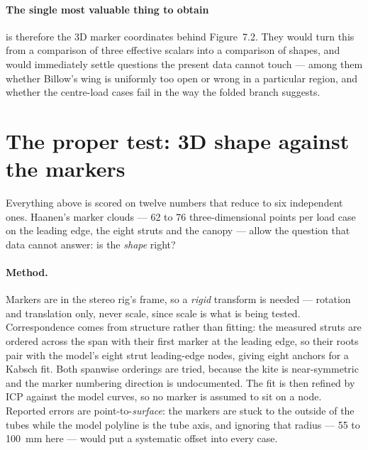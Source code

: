 \documentclass[11pt,a4paper]{article}
\begin{document}
\paragraph{The single most valuable thing to obtain} is therefore the 3D marker
coordinates behind Figure~7.2. They would turn this from a comparison of three
effective scalars into a comparison of shapes, and would immediately settle
questions the present data cannot touch --- among them whether Billow's wing is
uniformly too open or wrong in a particular region, and whether the centre-load
cases fail in the way the folded branch suggests.

\section{The proper test: 3D shape against the markers}
\label{sec:shape}

Everything above is scored on twelve numbers that reduce to six independent
ones. Haanen's marker clouds --- 62 to 76 three-dimensional points per load case
on the leading edge, the eight struts and the canopy --- allow the question that
data cannot answer: is the \emph{shape} right?

\paragraph{Method.} Markers are in the stereo rig's frame, so a \emph{rigid}
transform is needed --- rotation and translation only, never scale, since scale
is what is being tested. Correspondence comes from structure rather than
fitting: the measured struts are ordered across the span with their first marker
at the leading edge, so their roots pair with the model's eight strut
leading-edge nodes, giving eight anchors for a Kabsch fit. Both spanwise
orderings are tried, because the kite is near-symmetric and the marker numbering
direction is undocumented. The fit is then refined by ICP against the model
curves, so no marker is assumed to sit on a node. Reported errors are
point-to-\emph{surface}: the markers are stuck to the outside of the tubes while
the model polyline is the tube axis, and ignoring that radius --- 55 to
\SI{100}{mm} here --- would put a systematic offset into every case.

\begin{table}[htbp]
\centering
\caption{Point-to-surface RMS between the solved shape and the photogrammetry
markers. ``As built'' is the undeformed geometry, included as the null model:
anything not beating it has explained nothing.}

\end{table}
\end{document}
